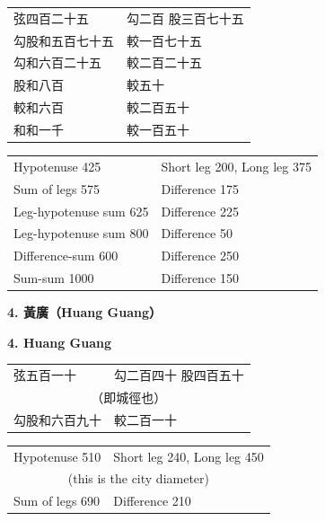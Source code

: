 \documentclass[11pt,a4paper]{article}
\newlength{\chwidth}
\newlength{\enwidth}
\newcommand{\zh}[1]{{\CJKfamily{sf}#1}}
\newenvironment{bilingual}{%
  \noindent
  \begin{minipage}[t]{\chwidth}%
  \small
}{%
  \end{minipage}%
}
\newcommand{\switchcolumn}{%
  \end{minipage}%
  \hfill%
  \begin{minipage}[t]{\enwidth}%
  \small
}
\newcommand{\bilingualpair}[2]{%
  \noindent
  \begin{minipage}[t]{\chwidth}%
  \small\zh{#1}%
  \end{minipage}%
  \hfill
  \begin{minipage}[t]{\enwidth}%
  \small #2%
  \end{minipage}%
  \par\vspace{0.3cm}
}
\begin{document}
\begin{bilingual}
\begin{center}
\zh{
\begin{tabular}{ll}
弦四百二十五 & 勾二百 \quad 股三百七十五 \\
勾股和五百七十五 & 較一百七十五 \\
勾和六百二十五 & 較二百二十五 \\
股和八百 & 較五十 \\
較和六百 & 較二百五十 \\
和和一千 & 較一百五十 \\
\end{tabular}
}
\end{center}

\switchcolumn

\begin{center}
\begin{tabular}{ll}
Hypotenuse 425 & Short leg 200, Long leg 375 \\
Sum of legs 575 & Difference 175 \\
Leg-hypotenuse sum 625 & Difference 225 \\
Leg-hypotenuse sum 800 & Difference 50 \\
Difference-sum 600 & Difference 250 \\
Sum-sum 1000 & Difference 150 \\
\end{tabular}
\end{center}
\end{bilingual}

\vspace{0.3cm}

\noindent\bilingualpair{\textbf{\zh{4. 黃廣（Huang Guang）}}}{\textbf{4. Huang Guang}}

\begin{bilingual}
\begin{center}
\zh{
\begin{tabular}{ll}
弦五百一十 & 勾二百四十 \quad 股四百五十 \\
\multicolumn{2}{c}{（即城徑也）} \\
勾股和六百九十 & 較二百一十 \\
\end{tabular}
}
\end{center}

\switchcolumn

\begin{center}
\begin{tabular}{ll}
Hypotenuse 510 & Short leg 240, Long leg 450 \\
\multicolumn{2}{c}{(this is the city diameter)} \\
Sum of legs 690 & Difference 210 \\
\end{tabular}
\end{center}
\end{bilingual}
\end{document}
